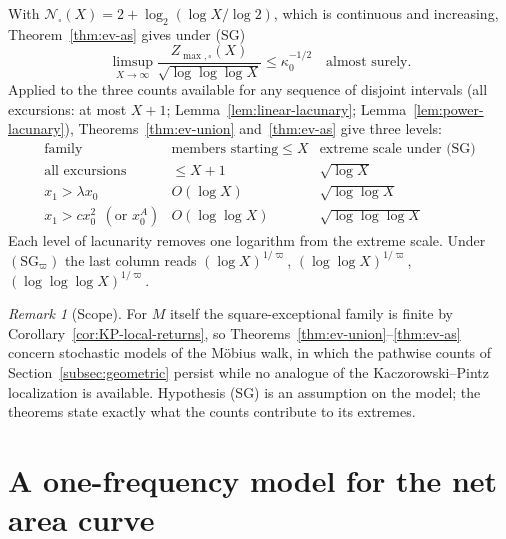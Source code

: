 \documentclass[11pt,reqno]{amsart}
\numberwithin{equation}{section}
\theoremstyle{plain}
\theoremstyle{definition}
\theoremstyle{remark}
\newtheorem{remark}[theorem]{Remark}
\begin{document}
With $\mathcal N_\square(X)=2+\log_2(\log X/\log2)$, which is continuous and
increasing, Theorem~\ref{thm:ev-as} gives under (SG)
\begin{equation}
\limsup_{X\to\infty}\frac{Z_{\max,\square}(X)}{\sqrt{\log\log\log X}}\le \kappa_0^{-1/2}
\quad\text{almost surely.}
\end{equation}
Applied to the three counts available for any sequence of disjoint
intervals (all excursions: at most $X+1$; Lemma~\ref{lem:linear-lacunary};
Lemma~\ref{lem:power-lacunary}), Theorems~\ref{thm:ev-union}
and~\ref{thm:ev-as} give three levels:
\begin{equation}
\begin{array}{c|c|c}
\text{family} & \text{members starting}\le X & \text{extreme scale under (SG)}\\
\hline
\text{all excursions} & \le X+1 & \sqrt{\log X}\\
x_1>\lambda x_0 & O(\log X) & \sqrt{\log\log X}\\
x_1>cx_0^2\ \ (\text{or }x_0^A) & O(\log\log X) & \sqrt{\log\log\log X}
\end{array}
\end{equation}
Each level of lacunarity removes one logarithm from the extreme scale.
Under $(\mathrm{SG}_\varpi)$ the last column reads $(\log X)^{1/\varpi}$,
$(\log\log X)^{1/\varpi}$, $(\log\log\log X)^{1/\varpi}$.

\begin{remark}[Scope]
\label{rem:ev-scope}
For $M$ itself the square-exceptional family is finite by
Corollary~\ref{cor:KP-local-returns}, so
Theorems~\ref{thm:ev-union}--\ref{thm:ev-as} concern stochastic models of
the M\"obius walk, in which the pathwise counts of
Section~\ref{subsec:geometric} persist while no analogue of the
Kaczorowski--Pintz localization is available. Hypothesis (SG) is an
assumption on the model; the theorems state exactly what the counts
contribute to its extremes.
\end{remark}


\section{A one-frequency model for the net area curve}
\label{sec:model}
\end{document}
